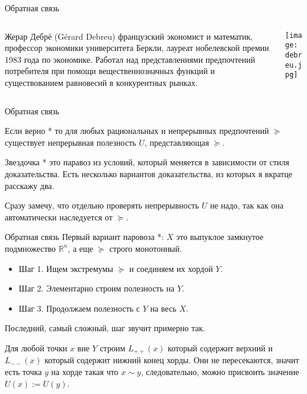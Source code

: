 \documentclass{beamer}
\begin{document}
\begin{frame}{Обратная связь}

\begin{columns}
\begin{column}{0.5\textwidth}
   \alert{Жерар Дебрё} (Gérard Debreu) французский экономист и математик, профессор экономики университета Беркли, лауреат нобелевской премии 1983 года по экономике. Работал над \alert{представлениями предпочтений потребителя при помощи вещественнозначных функций} и существованием равновесий в конкурентных рынках.
\end{column}
\begin{column}{0.5\textwidth}  %
    \begin{center}
     \texttt{[image: debreu.jpg]}
     \end{center}
\end{column}
\end{columns}

\end{frame}

\begin{frame}{Обратная связь}

\begin{theorem}[Дебрё]
Если верно * то для любых \alert{рациональных и непрерывных предпочтений} $\succcurlyeq$ существует \alert{непрерывная полезность} $U$, представляющая $\succcurlyeq$.
\end{theorem}

Звездочка * это паравоз из условий, который меняется в зависимости от стиля доказательства. Есть несколько вариантов доказательства, из которых я вкратце расскажу два.

Сразу замечу, что отдельно проверять непрерывность $U$ не надо, так как она автоматически наследуется от $\succcurlyeq$.

\end{frame}

\begin{frame}{Обратная связь}
Первый вариант паровоза *: $X$ это выпуклое замкнутое подмножество $\mathbb{R}^n$, а еще $\succcurlyeq$ строго монотонный.

\begin{itemize}
  \item Шаг 1. Ищем экстремумы $\succcurlyeq$ и соединяем их хордой $Y$.
  \item Шаг 2. Элементарно строим полезность на $Y$.
  \item Шаг 3. Продолжаем полезность с $Y$ на весь $X$.
\end{itemize}

Последний, самый сложный, шаг звучит примерно так. 

Для любой точки $x$ вне $Y$ строим $L_{++}(x)$ который содержит верхний и $L_{--}(x)$ который содержит нижний конец хорды. Они не пересекаются, значит есть точка $y$ на хорде такая что $x \sim y$, следовательно, можно присвоить значение $U(x) := U(y)$. 

\end{frame}
\end{document}
